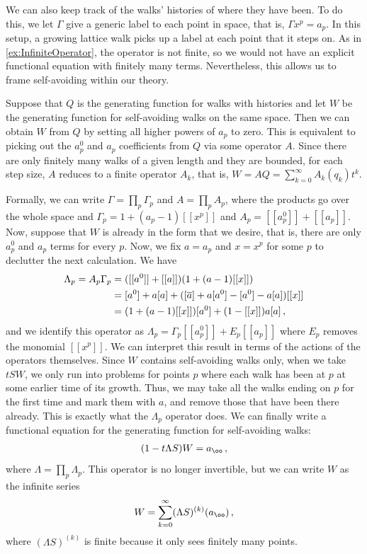 \begin{exa} We can also keep track of the walks' histories of where they have been. To do this, we let $\Gamma$ give a generic label to each point in space, that is, $\Gamma x^p = a_p$. In this setup, a growing lattice walk picks up a label at each point that it steps on. As in \autoref{ex:InfiniteOperator}, the operator is not finite, so we would not have an explicit functional equation with finitely many terms. Nevertheless, this allows us to frame self-avoiding within our theory. 

Suppose that $Q$ is the generating function for walks with histories and let $W$ be the generating function for self-avoiding walks on the same space. Then we can obtain $W$ from $Q$ by setting all higher powers of $a_p$ to zero. This is equivalent to picking out the $a_p^0$ and $a_p$ coefficients from $Q$ via some operator $A$. Since there are only finitely many walks of a given length and they are bounded, for each step size, $A$ reduces to a finite operator $A_k$, that is, $W = AQ = \sum_{k=0}^\infty A_k(q_k) t^k$.

Formally, we can write $\Gamma = \prod_p \Gamma_p$ and $A = \prod_p A_p$, where the products go over the whole space and $\Gamma_p = 1 + (a_p - 1)[[x^p]]$ and $A_p = [[a_p^0]] + [[a_p]]$. Now, suppose that $W$ is already in the form that we desire, that is, there are only $a_p^0$ and $a_p$ terms for every $p$. Now, we fix $a = a_p$ and $x = x^p$ for some $p$ to declutter the next calculation. We have
\begin{align}
	\Lambda_p = A_p\Gamma_p &= ([[a^0]]+[[a]])(1 + (a - 1)[[x]]) \\
				&= [a^0] + a[a] + ([\overline{a}]+a[a^0] - [a^0] - a[a])[[x]] \\
				&= (1 + (a - 1)[[x]])[a^0] + (1-[[x]])a[a]\,,
\end{align}
and we identify this operator as $ \Lambda_p =\Gamma_p [[a_p^0]]+ E_p[[a_p]]$ where $E_p$ removes the monomial $[[x^p]]$. We can interpret this result in terms of the actions of the operators themselves. Since $W$ contains self-avoiding walks only, when we take $tSW$, we only run into problems for points $p$ where each walk has been at $p$ at some earlier time of its growth. Thus, we may take all the walks ending on $p$ for the first time and mark them with $a$, and remove those that have been there already. This is exactly what the $\Lambda_p$ operator does. We can finally write a functional equation for the generating function for self-avoiding walks:
\begin{align}
	(1 - t \Lambda S)W = a_\oo\,,
\end{align}
where $\Lambda = \prod_p \Lambda_p$. This operator is no longer invertible, but we can write $W$ as the infinite series
\begin{align}
	W = \sum_{k = 0}^\infty (\Lambda S)^{(k)}(a_\oo)\,,
\end{align}
where $(\Lambda S)^{(k)}$ is finite because it only sees finitely many points.


\end{exa}
